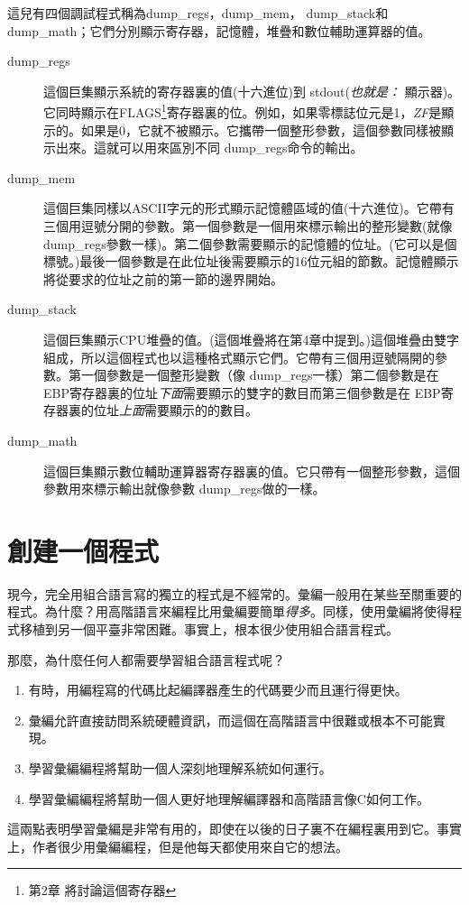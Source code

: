 這兒有四個調試程式稱為{\code dump\_regs}，{\code dump\_mem}，{\code
dump\_stack}和{\code
dump\_math}；它們分別顯示寄存器，記憶體，堆疊和數位輔助運算器的值。
\begin{description}

\item[dump\_regs]
這個巨集顯示系統的寄存器裏的值(十六進位)到{\code
stdout}(\emph{也就是：} 顯示器)。它同時顯示在FLAGS\footnote{第2章
將討論這個寄存器}寄存器裏的位。例如，如果零標誌位元是1，\emph{ZF}是顯示的。如果是0，它就不被顯示。它攜帶一個整形參數，這個參數同樣被顯示出來。這就可以用來區別不同{\code
dump\_regs}命令的輸出。

\item[dump\_mem]
這個巨集同樣以ASCII字元的形式顯示記憶體區域的值(十六進位)。它帶有三個用逗號分開的參數。第一個參數是一個用來標示輸出的整形變數(就像{\code
dump\_regs}參數一樣)。第二個參數需要顯示的記憶體的位址。(它可以是個標號。)最後一個參數是在此位址後需要顯示的16位元組的節數。記憶體顯示將從要求的位址之前的第一節的邊界開始。
\item[dump\_stack]
這個巨集顯示CPU堆疊的值。(這個堆疊將在第4章中提到。)這個堆疊由雙字組成，所以這個程式也以這種格式顯示它們。它帶有三個用逗號隔開的參數。第一個參數是一個整形變數（像{\code
dump\_regs}一樣）第二個參數是在{\code
EBP}寄存器裏的位址\emph{下面}需要顯示的雙字的數目而第三個參數是在{\code
EBP}寄存器裏的位址\emph{上面}需要顯示的的數目。

\item[dump\_math]
這個巨集顯示數位輔助運算器寄存器裏的值。它只帶有一個整形參數，這個參數用來標示輸出就像參數{\code
dump\_regs}做的一樣。
\end{description}
 

\section{創建一個程式}

現今，完全用組合語言寫的獨立的程式是不經常的。彙編一般用在某些至關重要的程式。為什麼？用高階語言來編程比用彙編要簡單\emph{得多}。同樣，使用彙編將使得程式移植到另一個平臺非常困難。事實上，根本很少使用組合語言程式。

那麼，為什麼任何人都需要學習組合語言程式呢？
\begin{enumerate}
\item 有時，用編程寫的代碼比起編譯器產生的代碼要少而且運行得更快。
\item 彙編允許直接訪問系統硬體資訊，而這個在高階語言中很難或根本不可能實現。
\item 學習彙編編程將幫助一個人深刻地理解系統如何運行。
\item 學習彙編編程將幫助一個人更好地理解編譯器和高階語言像C如何工作。
\end{enumerate}
這兩點表明學習彙編是非常有用的，即使在以後的日子裏不在編程裏用到它。事實上，作者很少用彙編編程，但是他每天都使用來自它的想法。

